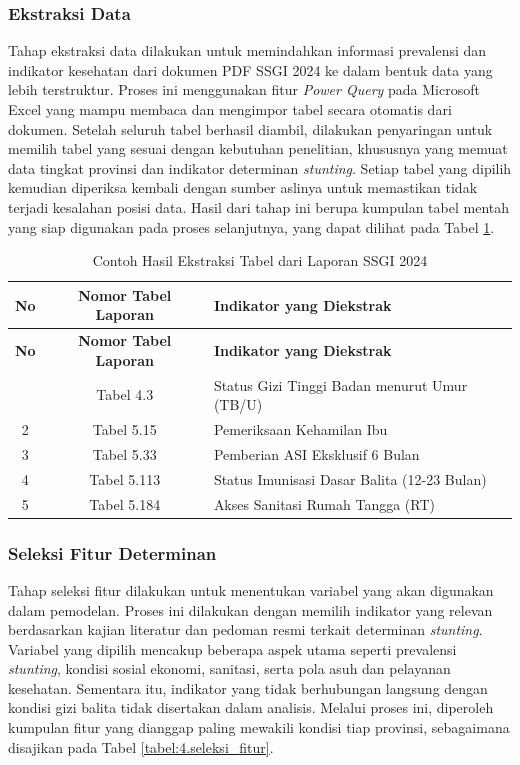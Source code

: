 \subsubsection{Ekstraksi Data}
Tahap ekstraksi data dilakukan untuk memindahkan informasi prevalensi dan indikator kesehatan dari dokumen PDF SSGI 2024 ke dalam bentuk data yang lebih terstruktur. Proses ini menggunakan fitur \textit{Power Query} pada Microsoft Excel yang mampu membaca dan mengimpor tabel secara otomatis dari dokumen. Setelah seluruh tabel berhasil diambil, dilakukan penyaringan untuk memilih tabel yang sesuai dengan kebutuhan penelitian, khususnya yang memuat data tingkat provinsi dan indikator determinan \textit{stunting}. Setiap tabel yang dipilih kemudian diperiksa kembali dengan sumber aslinya untuk memastikan tidak terjadi kesalahan posisi data. Hasil dari tahap ini berupa kumpulan tabel mentah yang siap digunakan pada proses selanjutnya, yang dapat dilihat pada Tabel \ref{table:4.hasil_ekstraksi}.

\begin{longtable}{|c|c|p{}|}
    \caption{Contoh Hasil Ekstraksi Tabel dari Laporan SSGI 2024}
    \label{table:4.hasil_ekstraksi}\\
    \hline
    \textbf{No} & \textbf{Nomor Tabel Laporan} & \textbf{Indikator yang Diekstrak} \\ 
    \hline
    \endfirsthead
    \hline
    \textbf{No} & \textbf{Nomor Tabel Laporan} & \textbf{Indikator yang Diekstrak} \\ 
    \hline
    \endhead
    \hline
    \endfoot
    \hline
    \endlastfoot
    1 & Tabel 4.3 & Status Gizi Tinggi Badan menurut Umur (TB/U) \\ 
    \hline
    2 & Tabel 5.15 & Pemeriksaan Kehamilan Ibu \\
    \hline
    3 & Tabel 5.33 & Pemberian ASI Eksklusif 6 Bulan \\
    \hline
    4 & Tabel 5.113 & Status Imunisasi Dasar Balita (12-23 Bulan) \\
    \hline
    5 & Tabel 5.184 & Akses Sanitasi Rumah Tangga (RT) \\
    \hline
\end{longtable}

\subsubsection{Seleksi Fitur Determinan}
Tahap seleksi fitur dilakukan untuk menentukan variabel yang akan digunakan dalam pemodelan. Proses ini dilakukan dengan memilih indikator yang relevan berdasarkan kajian literatur dan pedoman resmi terkait determinan \textit{stunting}. Variabel yang dipilih mencakup beberapa aspek utama seperti prevalensi \textit{stunting}, kondisi sosial ekonomi, sanitasi, serta pola asuh dan pelayanan kesehatan. Sementara itu, indikator yang tidak berhubungan langsung dengan kondisi gizi balita tidak disertakan dalam analisis. Melalui proses ini, diperoleh kumpulan fitur yang dianggap paling mewakili kondisi tiap provinsi, sebagaimana disajikan pada Tabel \ref{tabel:4.seleksi_fitur}.

